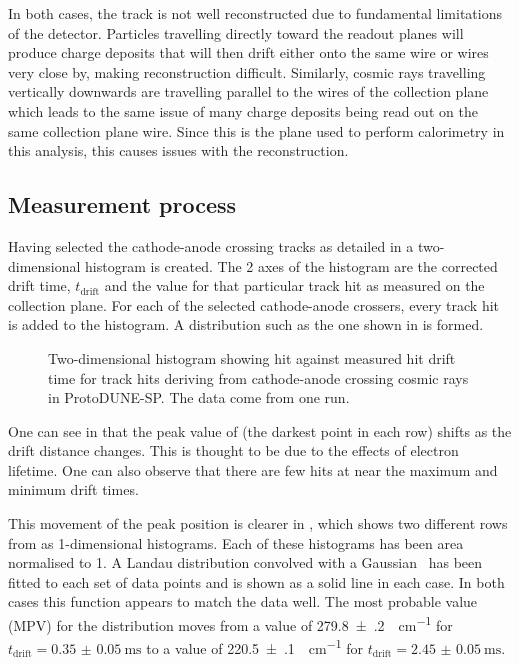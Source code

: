 In both cases, the track \dqdx is not well reconstructed due to fundamental limitations of the detector. 
Particles travelling directly toward the readout planes will produce charge deposits that will then drift either onto the same wire or wires very close by, making reconstruction difficult.
Similarly, cosmic rays travelling vertically downwards are travelling parallel to the wires of the collection plane which leads to the same issue of many charge deposits being read out on the same collection plane wire.
Since this is the plane used to perform calorimetry in this analysis, this causes issues with the reconstruction.

\subsection{Measurement process}

Having selected the cathode-anode crossing tracks as detailed in  a two-dimensional histogram is created.
The 2 axes of the histogram are the corrected drift time, $t_{\text{drift}}$ and the \dqdx value for that particular track hit as measured on the collection plane. 
For each of the selected cathode-anode crossers, every track hit is added to the histogram.
A distribution such as the one shown in  is formed.

\begin{figure}[h]
	\begin{adjustbox}{max totalsize=.7\linewidth, center}
		
	\end{adjustbox}
	\caption[Hit drift time vs. measured \dqdx for cathode-anode crossers in ProtoDUNE-SP]{Two-dimensional histogram showing hit \dqdx against measured hit drift time for track hits deriving from cathode-anode crossing cosmic rays in ProtoDUNE-SP. The data come from one run.}
	\label{fig:dqdxDrift}
\end{figure}

One can see in  that the peak value of \dqdx (the darkest point in each row) shifts as the drift distance changes.
This is thought to be due to the effects of electron lifetime.
One can also observe that there are few hits at near the maximum and minimum drift times.

This movement of the peak position is clearer in , which shows two different rows from  as 1-dimensional histograms.
Each of these histograms has been area normalised to 1.
A Landau distribution convolved with a Gaussian~\cite{langaus} has been fitted to each set of data points and is shown as a solid line in each case.
In both cases this function appears to match the data well.
The most probable value (MPV) for the distribution moves from a value of \SI{279.8(2)}{\ADC\per\cm} for $t_{\text{drift}} = \SI{0.35(5)}{\ms}$ to a value of \SI{220.5(1)}{\ADC\per\cm} for $t_{\text{drift}} = \SI{2.45(5)}{\ms}$.

